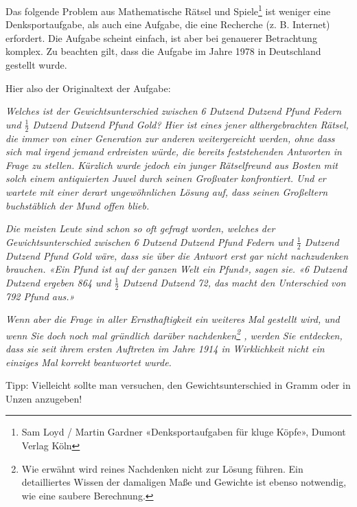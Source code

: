 Das folgende Problem aus Mathematische Rätsel und Spiele\footnote{Sam Loyd / Martin Gardner «Denksportaufgaben für kluge Köpfe», Dumont
Verlag Köln} ist weniger eine
Denksportaufgabe, als auch eine Aufgabe, die eine Recherche (z. B. Internet)
erfordert. Die Aufgabe scheint einfach, ist aber bei genauerer Betrachtung
komplex. Zu beachten gilt, dass die Aufgabe im Jahre 1978 in Deutschland
gestellt wurde.

Hier also der Originaltext der Aufgabe:

\textit{
Welches ist der Gewichtsunterschied zwischen 6
Dutzend Dutzend Pfund Federn und $\frac12$ Dutzend
Dutzend Pfund Gold?
Hier ist eines jener althergebrachten Rätsel, die immer
von einer Generation zur anderen weitergereicht
werden, ohne dass sich mal irgend jemand erdreisten
würde, die bereits feststehenden Antworten in Frage
zu stellen. Kürzlich wurde jedoch ein junger
Rätselfreund aus Bosten mit solch einem antiquierten
Juwel durch seinen Großvater konfrontiert. Und er
wartete mit einer derart ungewöhnlichen Lösung auf,
dass seinen Großeltern buchstäblich der Mund offen blieb.}

\textit{Die meisten Leute sind schon so oft gefragt worden,
welches der Gewichtsunterschied zwischen 6 Dutzend
Dutzend Pfund Federn und $\frac12$ Dutzend Dutzend Pfund
Gold wäre, dass sie über die Antwort erst gar nicht
nachzudenken brauchen. «Ein Pfund ist auf der ganzen
Welt ein Pfund», sagen sie. «6 Dutzend Dutzend
ergeben 864 und $\frac12$ Dutzend Dutzend 72, das macht
den Unterschied von 792 Pfund aus.»}

\textit{Wenn aber die Frage in aller Ernsthaftigkeit ein
weiteres Mal gestellt wird, und wenn Sie doch noch
mal gründlich darüber nachdenken\footnote{Wie erwähnt wird reines Nachdenken nicht zur Lösung führen. Ein detailliertes
Wissen der damaligen Maße und Gewichte ist ebenso notwendig, wie eine
saubere Berechnung.} , werden Sie
entdecken, dass sie seit ihrem ersten Auftreten im
Jahre 1914 in Wirklichkeit nicht ein einziges Mal
korrekt beantwortet wurde.
}%

Tipp: Vielleicht sollte man versuchen, den Gewichtsunterschied in Gramm oder
in Unzen anzugeben!



